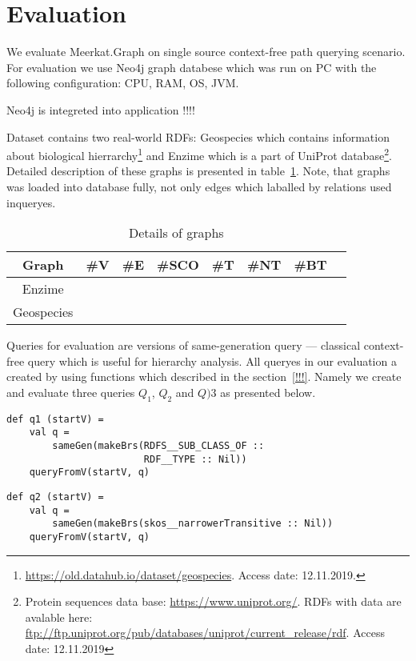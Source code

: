 \section{Evaluation}

We evaluate Meerkat.Graph on single source context-free path querying scenario.
For evaluation we use Neo4j graph databese which was run on PC with the following configuration: CPU, RAM, OS, JVM.

Neo4j is integreted into application !!!!

Dataset contains two real-world RDFs: Geospecies which contains information about biological hierrarchy\footnote{\url{https://old.datahub.io/dataset/geospecies}. Access date: 12.11.2019.} and Enzime which is a part of UniProt database\footnote{Protein sequences data base: \url{https://www.uniprot.org/}. RDFs with data are avalable here: \url{ftp://ftp.uniprot.org/pub/databases/uniprot/current_release/rdf}. Access date: 12.11.2019}.
Detailed description of these graphs is presented in table~\ref{tbl:datasetDetails}.
Note, that graphs was loaded into database fully, not only edges which laballed by relations used inqueryes.

\begin{table}[ht]
\begin{tabular}{|c|c|c|c|c|c|c|c|}
\hline
 Graph & \#V & \#E & \#SCO & \#T & \#NT & \#BT \\
 \hline
 Enzime &  &  &  &  & & \\
 Geospecies &  &  &  &  & & \\
 \hline
\end{tabular}
\caption{Details of graphs}
\label{tbl:datasetDetails}
\end{table}

Queries for evaluation are versions of same-generation query --- classical context-free query which is useful for hierarchy analysis.
All queryes in our evaluation a created by using functions which described in the section~\ref{!!!}. Namely we create and evaluate three queries $Q_1$, $Q_2$ and $Q)3$ as presented below.

\begin{lstlisting}
def q1 (startV) =
    val q =
        sameGen(makeBrs(RDFS__SUB_CLASS_OF ::
                        RDF__TYPE :: Nil))
    queryFromV(startV, q)
\end{lstlisting}

\begin{lstlisting}
def q2 (startV) =
    val q =
        sameGen(makeBrs(skos__narrowerTransitive :: Nil))
    queryFromV(startV, q)
\end{lstlisting}

